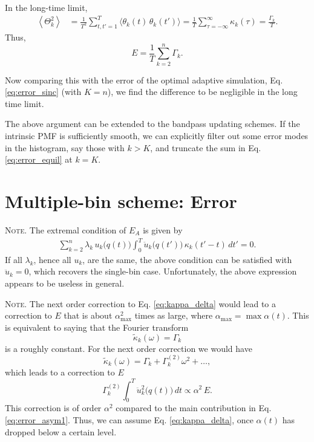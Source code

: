 \documentclass[reprint, floatfix]{revtex4-1}
\newcommand{\note}[1]{{\color{DarkGreen}\footnotesize \textsc{Note.} #1}}
\newcommand{\Err}{E}
\begin{document}
In the long-time limit,
\begin{align*}
  \left\langle
    \Theta_k^2
  \right\rangle
  &=
  \frac{1}{T^2}
  \sum_{ t, t' = 1 }^T
  \langle \theta_k(t) \, \theta_k(t') \rangle
  =
  \frac{1}{T}
  \sum_{\tau = -\infty}^\infty
    \kappa_k(\tau)
  =
  \frac{ \Gamma_k }{ T }
.
\end{align*}
%
Thus,
\begin{equation}
  E
  =
  \frac{ 1 } { T }
  \sum_{ k = 2 }^n \Gamma_k
  .
\label{eq:error_equil}
\end{equation}

Now comparing this with the error of
the optimal adaptive simulation,
Eq. \eqref{eq:error_sinc} (with $K = n$),
we find the difference to be negligible
in the long time limit.

The above argument can be extended
to the bandpass updating schemes.
%
If the intrinsic PMF is sufficiently smooth,
we can explicitly filter out some error modes
in the histogram,
say those with $k >  K$,
and truncate the sum in
Eq. \eqref{eq:error_equil} at $k = K$.








\section{Multiple-bin scheme: Error}



\note{The extremal condition of $\Err_A$ is given by
%
\begin{align}
  \sum_{k = 2}^n
  \lambda_k \, u_k\bigl( q(t) \bigr)
  \int_0^T
    \ddot u_k \bigl( q(t') \bigr) \,
    \kappa_k(t' - t) \, dt' = 0.
  \tag{N1}
\label{eq:optimal_mbin}
\end{align}
%
If all $\lambda_k$, hence all $u_k$, are the same,
the above condition can be satisfied with $\ddot u_k = 0$,
which recovers the single-bin case.
%
Unfortunately, the above expression
appears to be useless in general.
}


\note{The next order correction to Eq. \eqref{eq:kappa_delta}
would lead to a correction to $\Err$
that is about $\alpha_{\max}^2$ times as large,
where $\alpha_{\max} = \max \alpha(t)$.
%
This is equivalent to saying that the Fourier transform
  $$
  \tilde \kappa_k(\omega) = \Gamma_k
  $$
  is a roughly constant.
  For the next order correction we would have
  $$
  \tilde \kappa_k(\omega) = \Gamma_k + \Gamma^{(2)}_k \omega^2 + \dots,
  $$
  which leads to a correction to $\Err$
  $$
  \Gamma^{(2)}_k
  \int_0^T \ddot u_k^2\bigl( q(t) \bigr) \, dt
  \propto
  \alpha^2 \, \Err.
  $$
  This correction is of order $\alpha^2$
  compared to the main contribution in Eq. \eqref{eq:error_asym1}.
  Thus, we can assume Eq. \eqref{eq:kappa_delta},
  once $\alpha(t)$ has dropped below a certain level.
}%
\end{document}
